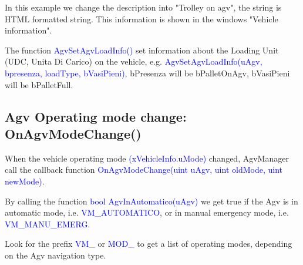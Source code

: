 In this example we change the description into "Trolley on agv", the string is HTML formatted string. This information is shown in the windows "Vehicle information".

The function \textcolor{blue}{AgvSetAgvLoadInfo()} set information about the Loading Unit (UDC, Unita Di Carico) on the vehicle, e.g. \textcolor{blue}{AgvSetAgvLoadInfo(uAgv, bpresenza, loadType, bVasiPieni)}, bPresenza will be bPalletOnAgv, bVasiPieni will be bPalletFull.

\subsection{Agv Operating mode change: OnAgvModeChange()}
When the vehicle operating mode \textcolor{blue}{(xVehicleInfo.uMode)} changed, AgvManager call the callback function \textcolor{blue}{OnAgvModeChange(uint uAgv, uint oldMode, uint newMode)}.

By calling the function \textcolor{blue}{bool AgvInAutomatico(uAgv)} we get true if the Agv is in automatic mode, i.e. \textcolor{blue}{VM\_AUTOMATICO}, or in manual emergency mode, i.e. \textcolor{blue}{VM\_MANU\_EMERG}.

Look for the prefix \textcolor{blue}{VM\_} or \textcolor{blue}{MOD\_} to get a list of operating modes, depending on the Agv navigation type.














